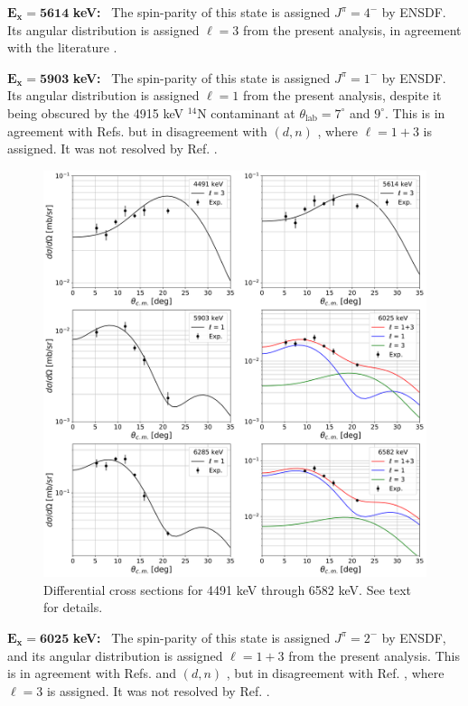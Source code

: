 \emph{$\mathbf{E_{x} = 5614}$} \textbf{keV:} \, 
The spin-parity of this state is assigned $J^{\pi} = 4^{-}$ by ENSDF. Its angular distribution is assigned $\ell=3$ from the present analysis, in agreement with the literature \cite{Erskine1966,Seth1967,Forster1970,Cage1971,Fuchs1969}.

\emph{$\mathbf{E_{x} = 5903}$} \textbf{keV:} \, 
The spin-parity of this state is assigned $J^{\pi} = 1^{-}$ by ENSDF. Its angular distribution is assigned $\ell=1$ from the present analysis, despite it being obscured by the 4915 keV $^{14}$N contaminant at $\theta_{\mathrm{lab}} = 7^{\circ}$ and $9^{\circ}$. This is in agreement with Refs. \cite{Erskine1966,Seth1967,Cage1971} but in disagreement with $(d,n)$ \cite{Fuchs1969}, where $\ell = 1+3$ is assigned. It was not resolved by Ref. \cite{Forster1970}.

\begin{figure}[!p]
\centering
\includegraphics[width=6.5in]{Chapter-6/figs/diffcross_6panel_1.png}
\caption{\label{fig:diffcross_6panel_1}Differential cross sections for 4491 keV through 6582 keV. See text for details.}
\end{figure}

\emph{$\mathbf{E_{x} = 6025}$} \textbf{keV:} \, 
The spin-parity of this state is assigned $J^{\pi} = 2^{-}$ by ENSDF, and its angular distribution is assigned $\ell=1+3$ from the present analysis. This is in agreement with Refs. \cite{Erskine1966,Seth1967} and $(d,n)$ \cite{Fuchs1969}, but in disagreement with Ref. \cite{Cage1971}, where $\ell=3$ is assigned. It was not resolved by Ref. \cite{Forster1970}.

